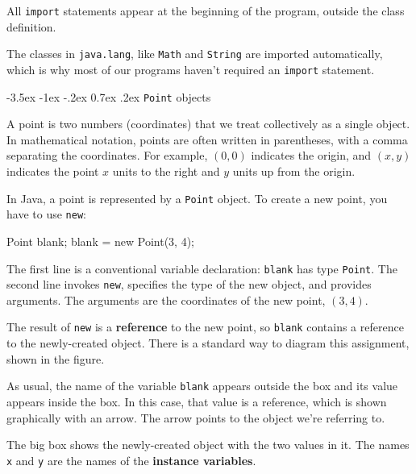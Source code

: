 \documentclass{book}
\makeatletter
\renewcommand{\section}{\@startsection 
    {section} {1} {0mm}%
    {-3.5ex \@plus -1ex \@minus -.2ex}%
    {0.7ex \@plus.2ex}%
    {\normalfont\Large\bfseries}}
\makeatother
\begin{document}
All {\tt import} statements appear at the beginning of the program,
outside the class definition.

The classes in {\tt java.lang}, like {\tt Math} and {\tt String} are
imported automatically, which is why most of our programs haven't
required an {\tt import} statement.


\section{{\tt Point} objects}

A point is two numbers (coordinates)
that we treat collectively as a single object.  In mathematical
notation, points are often written in parentheses, with a comma
separating the coordinates.  For example, $(0, 0)$ indicates
the origin, and $(x, y)$ indicates the point $x$ units to the
right and $y$ units up from the origin.


In Java, a point is represented by a {\tt Point} object.  To
create a new point, you have to use {\tt new}:

\begin{verbatimtab}
    Point blank;
    blank = new Point(3, 4);
\end{verbatimtab}
% 
The first line is a conventional variable declaration: {\tt blank}
has type {\tt Point}.  The second line invokes {\tt new}, specifies
the type of the new object, and provides arguments.  The arguments are
the coordinates of the new point, $(3, 4)$.


The result of {\tt new} is a {\bf reference} to the new
point, so {\tt blank} contains a reference to the
newly-created object.  There is a standard way to diagram this
assignment, shown in the figure.




As usual, the name of the variable {\tt blank} appears outside the box
and its value appears inside the box.  In this case, that value is a
reference, which is shown graphically with an arrow.  The
arrow points to the object we're referring to.

The big box shows the newly-created object with the two values
in it.  The names {\tt x} and {\tt y} are the names of the {\bf
instance variables}.
\end{document}
